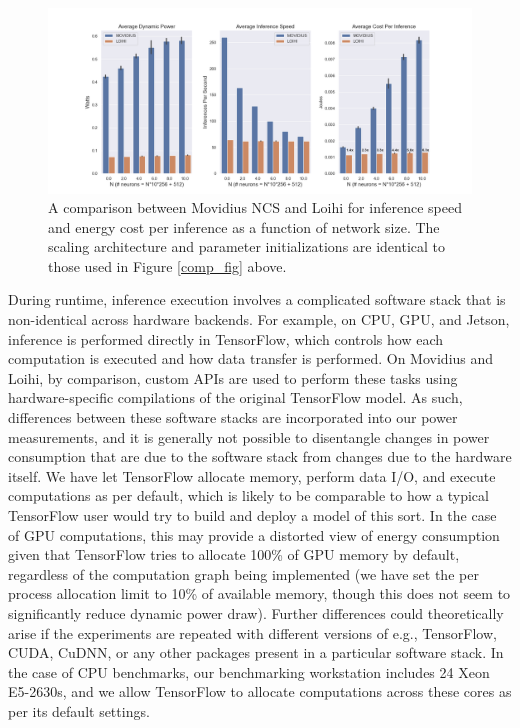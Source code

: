 \documentclass{article}
\begin{document}
\begin{figure}[ht!]
\centering
    \includegraphics[width=6.7in]{./figures/movidius_summary.png}
    \caption{A comparison between Movidius NCS and Loihi for inference speed and energy cost per inference as a function of network size. The scaling architecture and parameter initializations are identical to those used in Figure \ref{comp_fig} above.}
\label{scaling_fig}
\end{figure}

During runtime, inference execution involves a complicated software stack that is non-identical across hardware backends. For example, on CPU, GPU, and Jetson, inference is performed directly in TensorFlow, which controls how each computation is executed and how data transfer is performed. On Movidius and Loihi, by comparison, custom APIs are used to perform these tasks using hardware-specific compilations of the original TensorFlow model. As such, differences between these software stacks are incorporated into our power measurements, and it is generally not possible to disentangle changes in power consumption that are due to the software stack from changes due to the hardware itself. We have let TensorFlow allocate memory, perform data I/O, and execute computations as per default, which is likely to be comparable to how a typical TensorFlow user would try to build and deploy a model of this sort. In the case of GPU computations, this may provide a distorted view of energy consumption given that TensorFlow tries to allocate 100\% of GPU memory by default, regardless of the computation graph being implemented (we have set the per process allocation limit to 10\% of available memory, though this does not seem to significantly reduce dynamic power draw). Further differences could theoretically arise if the experiments are repeated with different versions of e.g., TensorFlow, CUDA, CuDNN, or any other packages present in a particular software stack. In the case of CPU benchmarks, our benchmarking workstation includes 24 Xeon E5-2630s, and we allow TensorFlow to allocate computations across these cores as per its default settings. 
\end{document}
